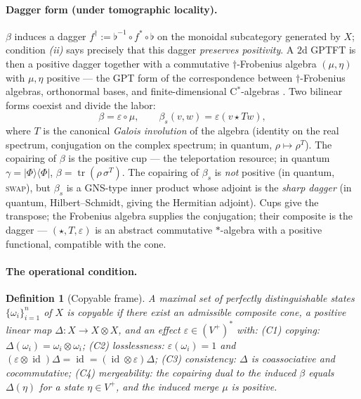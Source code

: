 \documentclass[prl,aps,10pt,superscriptaddress,floatfix]{revtex4-2}
\newtheorem*{defi}{Definition}
\begin{document}
\paragraph{Dagger form (under tomographic locality).}
$\beta$ induces a dagger $f^\dagger:=\flat^{-1}\!\circ f^*\circ\flat$ on the monoidal subcategory generated by $X$; condition \emph{(ii)} says precisely that this dagger \emph{preserves positivity}. A $2$d GPTFT is then a positive dagger together with a commutative $\dagger$-Frobenius algebra $(\mu,\eta)$ with $\mu,\eta$ positive --- the GPT form of the correspondence between $\dagger$-Frobenius algebras, orthonormal bases, and finite-dimensional C$^*$-algebras \cite{CPV2013,Vicary2011}. Two bilinear forms coexist and divide the labor:
\[
\beta=\varepsilon\circ\mu,
\qquad
\beta_s(v,w)=\varepsilon(v\star Tw),
\]
where $T$ is the canonical \emph{Galois involution} of the algebra (identity on the real spectrum, conjugation on the complex spectrum; in quantum, $\rho\mapsto\rho^{T}$). The copairing of $\beta$ is the positive cup --- the teleportation resource; in quantum $\gamma=|\Phi\rangle\langle\Phi|$, $\beta=\operatorname{tr}(\rho\,\sigma^{T})$. The copairing of $\beta_s$ is \emph{not} positive (in quantum, \textsc{swap}), but $\beta_s$ is a GNS-type inner product whose adjoint is the \emph{sharp dagger} (in quantum, Hilbert--Schmidt, giving the Hermitian adjoint). Cups give the transpose; the Frobenius algebra supplies the conjugation; their composite is the dagger --- $(\star,T,\varepsilon)$ is an abstract commutative $*$-algebra with a positive functional, compatible with the cone.

\paragraph{The operational condition.}

\begin{defi}[Copyable frame]
A maximal set of perfectly distinguishable states $\{\omega_i\}_{i=1}^{n}$ of $X$ is \emph{copyable} if there exist an admissible composite cone, a positive linear map $\Delta:X\to X\otimes X$, and an effect $\varepsilon\in(V^+)^*$ with:
\emph{(C1) copying:} $\Delta(\omega_i)=\omega_i\otimes\omega_i$;
\emph{(C2) losslessness:} $\varepsilon(\omega_i)=1$ and $(\varepsilon\otimes\operatorname{id})\Delta=\operatorname{id}=(\operatorname{id}\otimes\varepsilon)\Delta$;
\emph{(C3) consistency:} $\Delta$ is coassociative and cocommutative;
\emph{(C4) mergeability:} the copairing dual to the induced $\beta$ equals $\Delta(\eta)$ for a state $\eta\in V^+$, and the induced merge $\mu$ is positive.
\end{defi}
\end{document}
